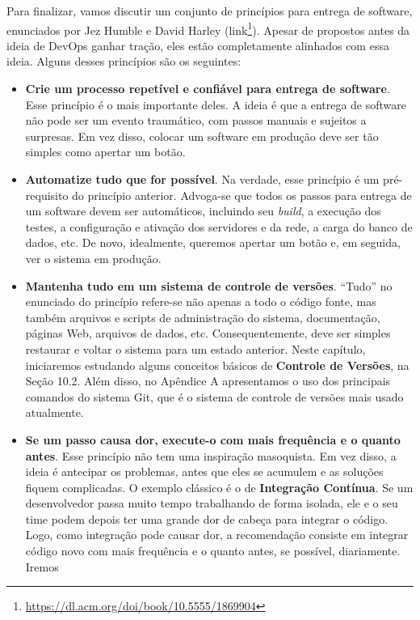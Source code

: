 \documentclass[
  11pt,
  twoside]{book}
\DeclareRobustCommand{\href}[2]{#2\footnote{\url{#1}}}
\begin{document}
  Para finalizar, vamos discutir
um conjunto de princípios para entrega de software, enunciados por Jez
Humble e David Harley
(\href{https://dl.acm.org/doi/book/10.5555/1869904}{link}). Apesar de
propostos antes da ideia de DevOps ganhar tração, eles estão
completamente alinhados com essa ideia. Alguns desses princípios são os
seguintes:

\begin{itemize}
\item
  \textbf{Crie um processo repetível e confiável para entrega de
  software}. Esse princípio é o mais importante deles. A ideia é que a
  entrega de software não pode ser um evento traumático, com passos
  manuais e sujeitos a surpresas. Em vez disso, colocar um software em
  produção deve ser tão simples como apertar um botão.
\item
  \textbf{Automatize tudo que for possível}. Na verdade, esse princípio
  é um pré-requisito do princípio anterior. Advoga-se que todos os
  passos para entrega de um software devem ser automáticos, incluindo
  seu \emph{build}, a execução dos testes, a configuração e ativação dos
  servidores e da rede, a carga do banco de dados, etc. De novo,
  idealmente, queremos apertar um botão e, em seguida, ver o sistema em
  produção.
\item
  \textbf{Mantenha tudo em um sistema de controle de versões}. ``Tudo''
  no enunciado do princípio refere-se não apenas a todo o código fonte,
  mas também arquivos e scripts de administração do sistema,
  documentação, páginas Web, arquivos de dados, etc. Consequentemente,
  deve ser simples restaurar e voltar o sistema para um estado anterior.
  Neste capítulo, iniciaremos estudando alguns conceitos básicos de
  \textbf{Controle de Versões}, na Seção 10.2. Além disso, no Apêndice A
  apresentamos o uso dos principais comandos do sistema Git, que é o
  sistema de controle de versões mais usado atualmente.
\item
  \textbf{Se um passo causa dor, execute-o com mais frequência e o
  quanto antes}. Esse princípio não tem uma inspiração masoquista. Em
  vez disso, a ideia é antecipar os problemas, antes que eles se
  acumulem e as soluções fiquem complicadas. O exemplo clássico é o de
  \textbf{Integração Contínua}. Se um desenvolvedor passa muito tempo
  trabalhando de forma isolada, ele e o seu time podem depois ter uma
  grande dor de cabeça para integrar o código. Logo, como integração
  pode causar dor, a recomendação consiste em integrar código novo com
  mais frequência e o quanto antes, se possível, diariamente. Iremos

\end{itemize}
\end{document}
